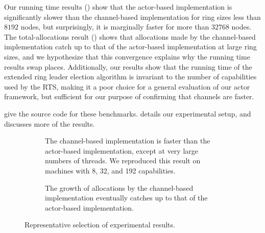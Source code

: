 \documentclass[sigplan,screen]{acmart}
\begin{document}
%
Our running time results () show that
the actor-based implementation is significantly slower
than the channel-based implementation for ring sizes less than $8192$ nodes,
but surprisingly, it is marginally faster for more than $32768$ nodes.
%
The total-allocations result () shows that
allocations made by the channel-based implementation
catch up to that of the actor-based implementation at large ring sizes,
and we hypothesize that this convergence
explains why the running time results swap places.
%
Additionally, our results show that the running time of the extended ring leader
election algorithm is invariant to the number of capabilities used by the RTS,
making it a poor choice for a general evaluation of our actor framework,
but sufficient for our purpose of confirming that channels are faster.

give the source code for these benchmarks.
 details our experimental setup, and
 discusses more of the results.


\begin{figure}
\raggedright

    \begin{subfigure}{\linewidth}
        \begin{small}
        \def\svgwidth{\linewidth}
        
        \end{small}
        \caption{
            The channel-based implementation is faster than the actor-based
            implementation, except at very large numbers of threads.
            We reproduced this result on machines with 8, 32, and 192 capabilities.
        }
        \label{fig:perf-eval-time-n32}
    \end{subfigure}

    \begin{subfigure}{\linewidth}
        \begin{small}
        \def\svgwidth{\linewidth}
        
        \end{small}
        \caption{
            The growth of allocations by the channel-based implementation
            eventually catches up to that of the actor-based implementation.
        }
        \label{fig:perf-eval-mem}
    \end{subfigure}

\caption{Representative selection of experimental results.}
\label{fig:perf-eval}
\end{figure}
\end{document}
